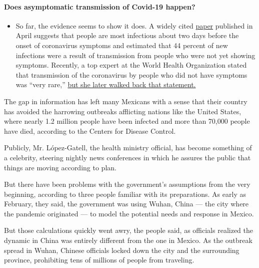 \begin{itemize}
{  \paragraph{Does asymptomatic transmission of Covid-19
  happen?}\label{does-asymptomatic-transmission-of-covid-19-happen}}

  \begin{itemize}
  \tightlist
  \item
    So far, the evidence seems to show it does. A widely cited
    \href{https://www.nature.com/articles/s41591-020-0869-5}{paper}
    published in April suggests that people are most infectious about
    two days before the onset of coronavirus symptoms and estimated that
    44 percent of new infections were a result of transmission from
    people who were not yet showing symptoms. Recently, a top expert at
    the World Health Organization stated that transmission of the
    coronavirus by people who did not have symptoms was ``very rare,''
    \href{https://www.nytimes.com/2020/06/09/world/coronavirus-updates.html?action=click\&pgtype=Article\&state=default\&region=MAIN_CONTENT_3\&context=storylines_faq\#link-1f302e21}{but
    she later walked back that statement.}
  \end{itemize}
\end{itemize}

The gap in information has left many Mexicans with a sense that their
country has avoided the harrowing outbreaks afflicting nations like the
United States, where nearly 1.2 million people have been infected and
more than 70,000 people have died, according to the Centers for Disease
Control.

Publicly, Mr. López-Gatell, the health ministry official, has become
something of a celebrity, steering nightly news conferences in which he
assures the public that things are moving according to plan.

But there have been problems with the government's assumptions from the
very beginning, according to three people familiar with its
preparations. As early as February, they said, the government was using
Wuhan, China --- the city where the pandemic originated --- to model the
potential needs and response in Mexico.

But those calculations quickly went awry, the people said, as officials
realized the dynamic in China was entirely different from the one in
Mexico. As the outbreak spread in Wuhan, Chinese officials locked down
the city and the surrounding province, prohibiting tens of millions of
people from traveling.

